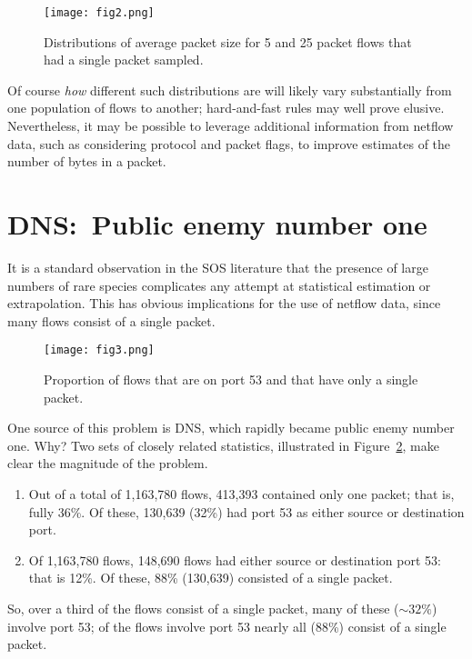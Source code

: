 \documentclass{paper}
\begin{document}
\begin{figure}[h]
\begin{center}
\texttt{[image: fig2.png]}
\caption{Distributions of average packet size for 5 and 25 packet flows that
had a single packet sampled.}
\label{pkt_size_dist}
\end{center}
\end{figure}

Of course \emph{how} different such distributions are will likely vary
substantially from one population of flows to another; hard-and-fast rules may
well prove elusive. Nevertheless, it may be possible to leverage additional
information from netflow data, such as considering protocol and packet flags, to
improve estimates of the number of bytes in a packet.

\section{DNS:\ Public enemy number one}\label{dns}

It is a standard observation in the SOS literature that the presence of large
numbers of rare species complicates any attempt at statistical estimation or
extrapolation. This has obvious implications for the use of netflow data, since
many flows consist of a single packet.

\begin{figure}[h]
\begin{center}
\texttt{[image: fig3.png]}
\caption{Proportion of flows that are on port 53 and that have only a single
packet.}
\label{dns_vs_single}
\end{center}
\end{figure}

One source of this problem is DNS, which rapidly became public enemy number one.
Why? Two sets of closely related statistics, illustrated in
Figure~\ref{dns_vs_single}, make clear the magnitude of the problem.

\begin{enumerate}
  \item Out of a total of 1,163,780 flows, 413,393 contained only one packet;
  that is, fully 36\%. Of these, 130,639 (32\%) had port 53 as either source or
  destination port.
  \item Of 1,163,780 flows, 148,690 flows had either source or destination port
  53: that is 12\%. Of these, 88\% (130,639) consisted of a single packet.
\end{enumerate}
So, over a third of the flows consist of a single packet, many of these ($\sim
32\%$) involve port 53; of the flows involve port 53 nearly all (88\%) consist
of a single packet.
\end{document}
